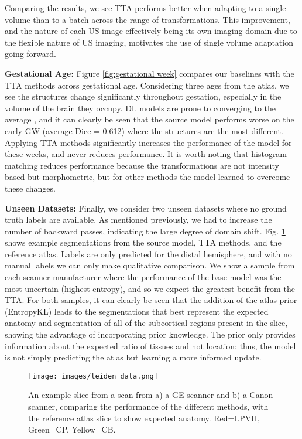 \documentclass[conference]{IEEEtran}
\begin{document}
Comparing the results, we see TTA performs better when adapting to a single volume than to a batch across the range of transformations. This improvement, and the nature of each US image effectively being its own imaging domain due to the flexible nature of US imaging, motivates the use of single volume adaptation going forward.

\noindent \textbf{Gestational Age:} Figure \ref{fig:gestational week} compares our baselines with the TTA methods across gestational age. Considering three ages from the atlas, we see the structures change significantly throughout gestation, especially in the volume of the brain they occupy. DL models are prone to converging to the average \cite{Dinsdale2021}, and it can clearly be seen that the source model performs worse on the early GW (average Dice = 0.612) where the structures are the most different. Applying TTA methods significantly increases the performance of the model for these weeks, and never reduces performance. It is worth noting that histogram matching reduces performance because the transformations are not intensity based but morphometric, but for other methods the model learned to overcome these changes.

\noindent \textbf{Unseen Datasets:} Finally, we consider two unseen datasets where no ground truth labels are available. As mentioned previously, we had to increase the number of backward passes, indicating the large degree of domain shift. Fig. \ref{fig:liden} shows example segmentations from the source model, TTA methods, and the reference atlas. Labels are only predicted for the distal hemisphere, and with no manual labels we can only make qualitative comparison. We show a sample from each scanner manufacturer where the performance of the base model was the most uncertain (highest entropy), and so we expect the greatest benefit from the TTA. For both samples, it can clearly be seen that the addition of the atlas prior (EntropyKL) leads to the segmentations that best represent the expected anatomy and segmentation of all of the subcortical regions present in the slice, showing the advantage of incorporating prior knowledge. The prior only provides information about the expected ratio of tissues and not location: thus, the model is not simply predicting the atlas but learning a more informed update.

\begin{figure}[t]
    \centering
    \texttt{[image: images/leiden\_data.png]}
    \caption{An example slice from a scan from a) a GE scanner and b) a Canon scanner, comparing the performance of the different methods, with the reference atlas slice to show expected anatomy. Red=LPVH, Green=CP, Yellow=CB.}
    \label{fig:liden}
    \vspace*{-15pt}
\end{figure}
\end{document}
